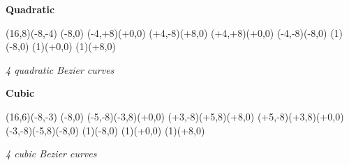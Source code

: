 


\begin{center}
{\Huge\bf{Quadratic}}
\bigskip

\begin{lapdf}(16,8)(-8,-4)
 \Blue
 \Quadratic(-8,0)
  (-4,+8)(+0,0)
  (+4,-8)(+8,0)
  (+4,+8)(+0,0)
  (-4,-8)(-8,0) \Stroke
 \Point(1)(-8,0)
 \Point(1)(+0,0)
 \Point(1)(+8,0)
\end{lapdf}

\em{4 quadratic Bezier curves}
\end{center}
\bigskip

\begin{center}
{\Huge\bf{Cubic}}
\bigskip

\begin{lapdf}(16,6)(-8,-3)
 \Red
 \Cubic(-8,0)
  (-5,-8)(-3,8)(+0,0)
  (+3,-8)(+5,8)(+8,0)
  (+5,-8)(+3,8)(+0,0)
  (-3,-8)(-5,8)(-8,0) \Stroke
 \Point(1)(-8,0)
 \Point(1)(+0,0)
 \Point(1)(+8,0)
\end{lapdf}

\em{4 cubic Bezier curves}
\end{center}

